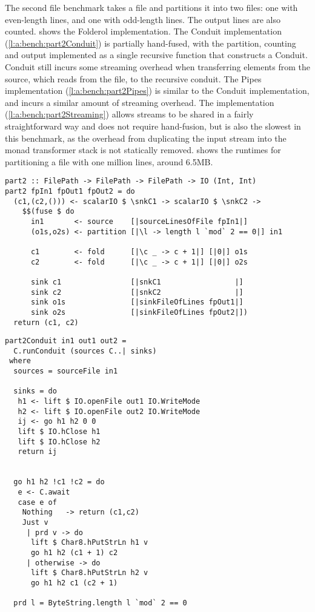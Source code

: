 The second file benchmark takes a file and partitions it into two files: one with even-length lines, and one with odd-length lines.
The output lines are also counted.
 shows the Folderol implementation.
The Conduit implementation (\cref{l:a:bench:part2Conduit}) is partially hand-fused, with the partition, counting and output implemented as a single recursive function that constructs a Conduit.
Conduit still incurs some streaming overhead when transferring elements from the source, which reads from the file, to the recursive conduit.
The Pipes implementation (\cref{l:a:bench:part2Pipes}) is similar to the Conduit implementation, and incurs a similar amount of streaming overhead.
The \Streaming implementation (\cref{l:a:bench:part2Streaming}) allows streams to be shared in a fairly straightforward way and does not require hand-fusion, but is also the slowest in this benchmark, as the overhead from duplicating the input stream into the monad transformer stack is not statically removed.
 shows the runtimes for partitioning a file with one million lines, around 6.5MB.

\begin{lstlisting}[float,label=l:bench:part2Folderol,caption=Folderol implementation of \Hs/part2/]
part2 :: FilePath -> FilePath -> FilePath -> IO (Int, Int)
part2 fpIn1 fpOut1 fpOut2 = do
  (c1,(c2,())) <- scalarIO $ \snkC1 -> scalarIO $ \snkC2 ->
    $$(fuse $ do
      in1       <- source    [|sourceLinesOfFile fpIn1|]
      (o1s,o2s) <- partition [|\l -> length l `mod` 2 == 0|] in1

      c1        <- fold      [|\c _ -> c + 1|] [|0|] o1s
      c2        <- fold      [|\c _ -> c + 1|] [|0|] o2s

      sink c1                [|snkC1                 |]
      sink c2                [|snkC2                 |]
      sink o1s               [|sinkFileOfLines fpOut1|]
      sink o2s               [|sinkFileOfLines fpOut2|])
  return (c1, c2)
\end{lstlisting}

\begin{lstlisting}[float,label=l:a:bench:part2Conduit,caption=Conduit implementation of \Hs/part2/]
part2Conduit in1 out1 out2 =
  C.runConduit (sources C..| sinks)
 where
  sources = sourceFile in1

  sinks = do
   h1 <- lift $ IO.openFile out1 IO.WriteMode
   h2 <- lift $ IO.openFile out2 IO.WriteMode
   ij <- go h1 h2 0 0
   lift $ IO.hClose h1
   lift $ IO.hClose h2
   return ij


  go h1 h2 !c1 !c2 = do
   e <- C.await
   case e of
    Nothing   -> return (c1,c2)
    Just v
     | prd v -> do
      lift $ Char8.hPutStrLn h1 v
      go h1 h2 (c1 + 1) c2
     | otherwise -> do
      lift $ Char8.hPutStrLn h2 v
      go h1 h2 c1 (c2 + 1)

  prd l = ByteString.length l `mod` 2 == 0
\end{lstlisting}

